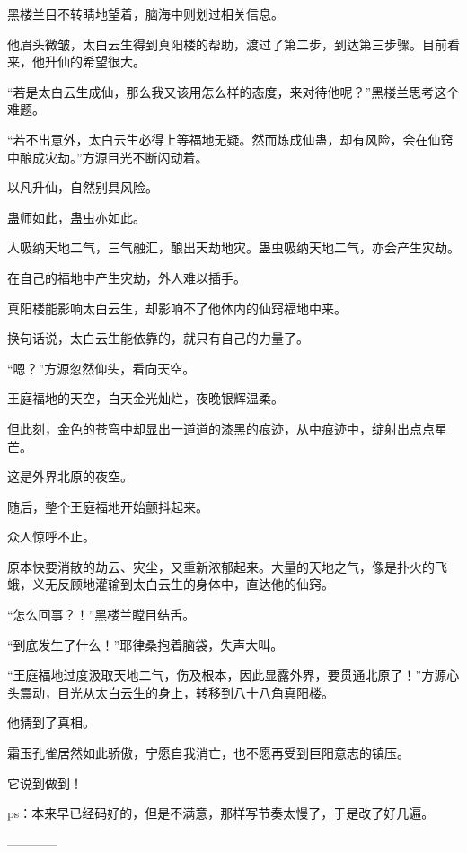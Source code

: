 \begin{this_body}
黑楼兰目不转睛地望着，脑海中则划过相关信息。

他眉头微皱，太白云生得到真阳楼的帮助，渡过了第二步，到达第三步骤。目前看来，他升仙的希望很大。

“若是太白云生成仙，那么我又该用怎么样的态度，来对待他呢？”黑楼兰思考这个难题。

“若不出意外，太白云生必得上等福地无疑。然而炼成仙蛊，却有风险，会在仙窍中酿成灾劫。”方源目光不断闪动着。

以凡升仙，自然别具风险。

蛊师如此，蛊虫亦如此。

人吸纳天地二气，三气融汇，酿出天劫地灾。蛊虫吸纳天地二气，亦会产生灾劫。

在自己的福地中产生灾劫，外人难以插手。

真阳楼能影响太白云生，却影响不了他体内的仙窍福地中来。

换句话说，太白云生能依靠的，就只有自己的力量了。

“嗯？”方源忽然仰头，看向天空。

王庭福地的天空，白天金光灿烂，夜晚银辉温柔。

但此刻，金色的苍穹中却显出一道道的漆黑的痕迹，从中痕迹中，绽射出点点星芒。

这是外界北原的夜空。

随后，整个王庭福地开始颤抖起来。

众人惊呼不止。

原本快要消散的劫云、灾尘，又重新浓郁起来。大量的天地之气，像是扑火的飞蛾，义无反顾地灌输到太白云生的身体中，直达他的仙窍。

“怎么回事？！”黑楼兰瞠目结舌。

“到底发生了什么！”耶律桑抱着脑袋，失声大叫。

“王庭福地过度汲取天地二气，伤及根本，因此显露外界，要贯通北原了！”方源心头震动，目光从太白云生的身上，转移到八十八角真阳楼。

他猜到了真相。

霜玉孔雀居然如此骄傲，宁愿自我消亡，也不愿再受到巨阳意志的镇压。

它说到做到！

ps：本来早已经码好的，但是不满意，那样写节奏太慢了，于是改了好几遍。

------------

\end{this_body}

